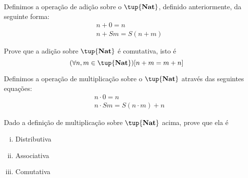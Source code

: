 \begin{definition}
    Definimos a operação de adição sobre o $\tup{\textbf{Nat}}$, definido
    anteriormente, da seguinte forma:
    \begin{align*}
        &n + 0 = n\tag{a1} \\
        &n + Sm = S(n + m)\tag{a2}
    \end{align*}

\end{definition}

\begin{exercise}
    Prove que a adição sobre $\tup{\textbf{Nat}}$ é comutativa, isto é
    $$ (\forall n, m \in \tup{\textbf{Nat}})[n + m = m + n] $$

\end{exercise}

\begin{homework}
    \begin{definition}
        Definimos a operação de multiplicação sobre o $\tup{\textbf{Nat}}$
        através das seguintes equações:
        \begin{align*}
            &n \cdot 0 = n\tag{m1} \\
            &n \cdot Sm = S(n \cdot m) + n\tag{m2}
        \end{align*}

    \end{definition}

    Dado a definição de multiplicação sobre $\tup{\textbf{Nat}}$ acima,
    prove que ela é

    \begin{enumerate}[(i)]
        \item Distributiva
        \item Associativa
        \item Comutativa
    \end{enumerate}
\end{homework}
